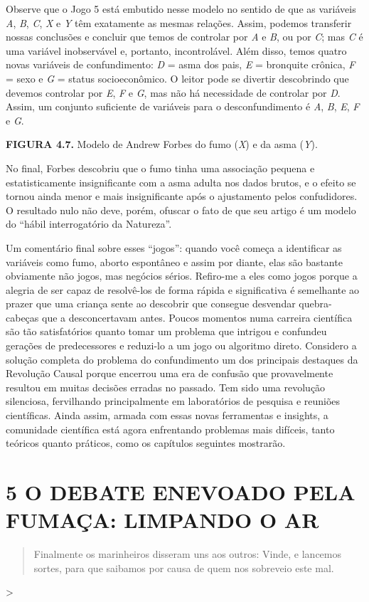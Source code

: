 \documentclass[11pt,a5paper,twoside]{book}
\begin{document}
Observe que o Jogo 5 está embutido nesse modelo no sentido de que as variáveis \textit{A}, \textit{B}, \textit{C}, \textit{X} e \textit{Y} têm exatamente as mesmas relações. Assim, podemos transferir nossas conclusões e concluir que temos de controlar por \textit{A} e \textit{B}, ou por \textit{C}; mas \textit{C} é uma variável inobservável e, portanto, incontrolável. Além disso, temos quatro novas variáveis de confundimento: \textit{D} = asma dos pais, \textit{E} = bronquite crônica, \textit{F} = sexo e \textit{G} = status socioeconômico. O leitor pode se divertir descobrindo que devemos controlar por \textit{E}, \textit{F} e \textit{G}, mas não há necessidade de controlar por \textit{D}. Assim, um conjunto suficiente de variáveis para o desconfundimento é \textit{A}, \textit{B}, \textit{E}, \textit{F} e \textit{G}.

\textbf{FIGURA 4.7.} Modelo de Andrew Forbes do fumo (\textit{X}) e da asma (\textit{Y}).

No final, Forbes descobriu que o fumo tinha uma associação pequena e estatisticamente insignificante com a asma adulta nos dados brutos, e o efeito se tornou ainda menor e mais insignificante após o ajustamento pelos confudidores. O resultado nulo não deve, porém, ofuscar o fato de que seu artigo é um modelo do “hábil interrogatório da Natureza”.

Um comentário final sobre esses “jogos”: quando você começa a identificar as variáveis como fumo, aborto espontâneo e assim por diante, elas são bastante obviamente não jogos, mas negócios sérios. Refiro-me a eles como jogos porque a alegria de ser capaz de resolvê-los de forma rápida e significativa é semelhante ao prazer que uma criança sente ao descobrir que consegue desvendar quebra-cabeças que a desconcertavam antes. Poucos momentos numa carreira científica são tão satisfatórios quanto tomar um problema que intrigou e confundeu gerações de predecessores e reduzi-lo a um jogo ou algoritmo direto. Considero a solução completa do problema do confundimento um dos principais destaques da Revolução Causal porque encerrou uma era de confusão que provavelmente resultou em muitas decisões erradas no passado. Tem sido uma revolução silenciosa, fervilhando principalmente em laboratórios de pesquisa e reuniões científicas. Ainda assim, armada com essas novas ferramentas e insights, a comunidade científica está agora enfrentando problemas mais difíceis, tanto teóricos quanto práticos, como os capítulos seguintes mostrarão.

\chapter{5 O DEBATE ENEVOADO PELA FUMAÇA: LIMPANDO O AR}
\begin{quote}
Finalmente os marinheiros disseram uns aos outros: Vinde, e lancemos sortes, para que saibamos por causa de quem nos sobreveio este mal.
\end{quote}
>
\end{document}
